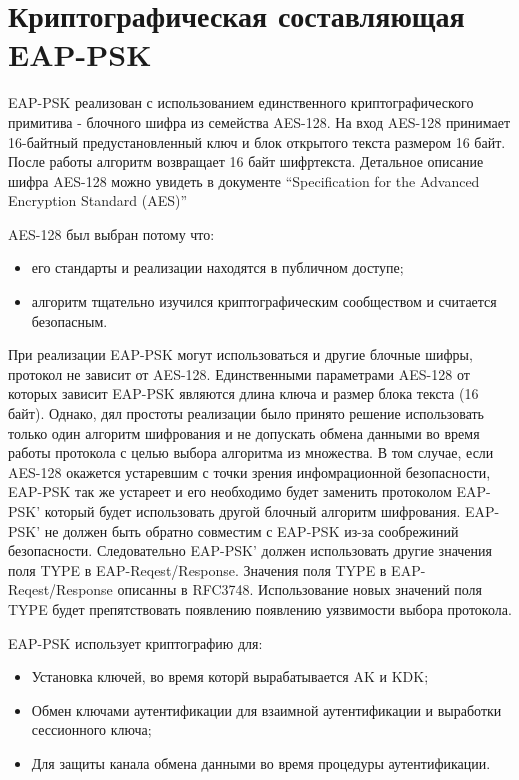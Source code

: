 \newpage
\section{Криптографическая составляющая EAP-PSK}

EAP-PSK реализован с использованием единственного криптографического примитива - блочного шифра из семейства AES-128. На вход AES-128 принимает 16-байтный предустановленный ключ и блок открытого текста размером 16 байт. После работы алгоритм возвращает 16 байт шифртекста. Детальное описание шифра AES-128 можно увидеть в документе ``Specification for the Advanced Encryption Standard (AES)'' 

AES-128 был выбран потому что:
\begin{itemize}
\item его стандарты и реализации находятся в публичном доступе;
\item алгоритм тщательно изучился криптографическим сообществом и считается безопасным.
\end{itemize}

При реализации EAP-PSK могут использоваться и другие блочные шифры, протокол не зависит от AES-128. Единственными параметрами AES-128 от которых зависит EAP-PSK являются длина ключа и размер блока текста (16 байт). Однако, дял простоты реализации было принято решение использовать только один алгоритм шифрования и не допускать обмена данными во время работы протокола с целью выбора алгоритма из множества. В том случае, если AES-128 окажется устаревшим с точки зрения инфомрационной безопасности, EAP-PSK так же устареет и его необходимо будет заменить протоколом EAP-PSK' который будет использовать другой блочный алгоритм шифрования. EAP-PSK' не должен быть обратно совместим с EAP-PSK из-за сообрежиний безопасности. Следовательно EAP-PSK' должен использовать другие значения поля TYPE в EAP-Reqest/Response. Значения поля TYPE в EAP-Reqest/Response описанны в RFC3748. Использование новых значений поля TYPE будет препятствовать появлению появлению уязвимости выбора протокола.

EAP-PSK использует криптографию для:
\begin{itemize}
\item Установка ключей, во время которй вырабатывается AK и KDK;
\item Обмен ключами аутентификации для взаимной аутентификации и выработки сессионного ключа;
\item Для защиты канала обмена данными во время процедуры аутентификации.
\end{itemize}


